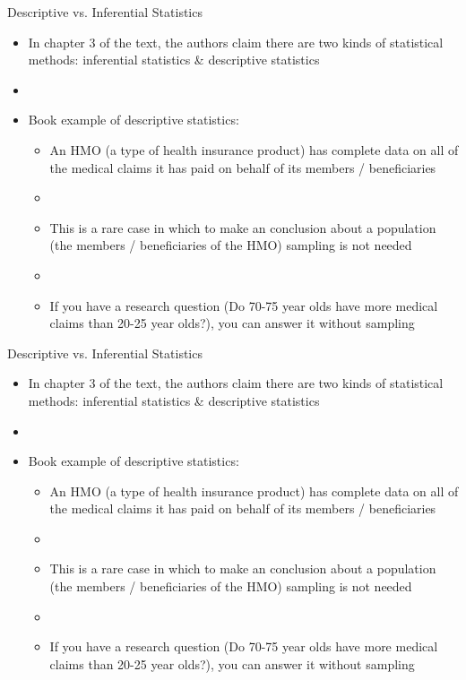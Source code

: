 \documentclass[xcolor=dvipsnames]{beamer}
\begin{document}
\begin{frame}{Descriptive vs. Inferential Statistics}
	\begin{itemize}
		\item In chapter 3 of the text, the authors claim there are two kinds of statistical methods: inferential statistics \& descriptive statistics
		\item[]
		\item Book example of descriptive statistics: \pause
		\begin{itemize}
			\item An HMO (a type of health insurance product) has complete data on all of the medical claims it has paid on behalf of its members / beneficiaries \pause
			\item[]
			\item This is a rare case in which to make an conclusion about a population (the members / beneficiaries of the HMO) sampling is not needed \pause
			\item[] 
			\item If you have a research question (Do 70-75 year olds have more medical claims than 20-25 year olds?), you can answer it without sampling \pause
		\end{itemize}
	\end{itemize}
\end{frame}

\begin{frame}{Descriptive vs. Inferential Statistics}
\begin{itemize}
	\item In chapter 3 of the text, the authors claim there are two kinds of statistical methods: inferential statistics \& descriptive statistics 
	\item[]
	\item Book example of descriptive statistics: 
	\begin{itemize}
		\item An HMO (a type of health insurance product) has complete data on all of the medical claims it has paid on behalf of its members / beneficiaries \pause
		\item[]
		\item This is a rare case in which to make an conclusion about a population (the members / beneficiaries of the HMO) sampling is not needed \pause
		\item[] 
		\item If you have a research question (Do 70-75 year olds have more medical claims than 20-25 year olds?), you can answer it without sampling 
	\end{itemize}
\end{itemize}
\end{frame}
\end{document}
